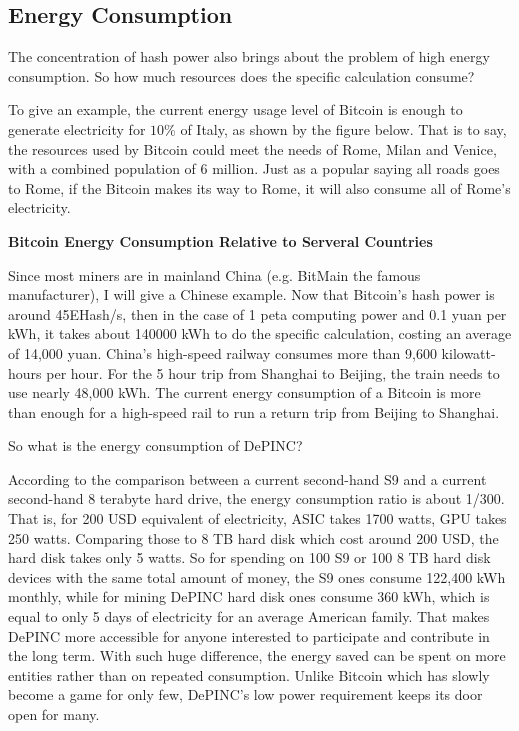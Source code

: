 \subsection{Energy Consumption}
\begin{flushleft}
    The concentration of hash power also brings about the problem of high energy consumption. So how much resources does the specific calculation consume?
\end{flushleft}
\begin{flushleft}
    To give an example, the current energy usage level of Bitcoin is enough to generate electricity for $10\%$ of Italy, as shown by the figure below. That is to say, the resources used by Bitcoin could meet the needs of Rome, Milan and Venice, with a combined population of 6 million. Just as a popular saying all roads goes to Rome, if the Bitcoin makes its way to Rome, it will also consume all of Rome's electricity.
\end{flushleft}
\begin{flushleft}
    \centering\textbf{Bitcoin Energy Consumption Relative to Serveral Countries}
\end{flushleft}

\begin{flushleft}
    Since most miners are in mainland China (e.g. BitMain the famous manufacturer), I will give a Chinese example. Now that Bitcoin's hash power is around 45EHash/s, then in the case of 1 peta computing power and 0.1 yuan per kWh, it takes about 140000 kWh to do the specific calculation, costing an average of 14,000 yuan. China's high-speed railway consumes more than 9,600 kilowatt-hours per hour. For the 5 hour trip from Shanghai to Beijing, the train needs to use nearly 48,000 kWh. The current energy consumption of a Bitcoin is more than enough for a high-speed rail to run a return trip from Beijing to Shanghai.
\end{flushleft}
\begin{flushleft}
    So what is the energy consumption of DePINC?
\end{flushleft}
\begin{flushleft}
    According to the comparison between a current second-hand S9 and a current second-hand 8 terabyte hard drive, the energy consumption ratio is about 1/300. That is, for 200 USD equivalent of electricity, ASIC takes 1700 watts, GPU takes 250 watts. Comparing those to 8 TB hard disk which cost around 200 USD, the hard disk takes only 5 watts. So for spending on 100 S9 or 100 8 TB hard disk devices with the same total amount of money, the S9 ones consume 122,400 kWh monthly, while for mining DePINC hard disk ones consume 360 kWh, which is equal to only 5 days of electricity for an average American family. That makes DePINC more accessible for anyone interested to participate and contribute in the long term. With such huge difference, the energy saved can be spent on more entities rather than on repeated consumption. Unlike Bitcoin which has slowly become a game for only few, DePINC’s low power requirement keeps its door open for many.
\end{flushleft}
